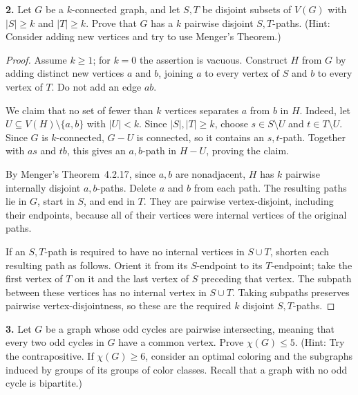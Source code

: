 \documentclass[12pt]{amsart}
\theoremstyle{conjecture}
\theoremstyle{definition}
\theoremstyle{question}
\theoremstyle{theorem}
\begin{document}
    \noindent\textbf{2.} Let $G$ be a $k$-connected graph, and let $S,T$ be disjoint subsets
    of $V(G)$ with $|S|\ge k$ and $|T|\ge k$.
    Prove that $G$ has a $k$ pairwise disjoint $S,T$-paths.
    (Hint: Consider adding new vertices and try to use Menger's Theorem.)

    \begin{proof}
        Assume $k\geq1$; for $k=0$ the assertion is vacuous.
        Construct $H$ from $G$ by adding distinct new vertices $a$ and $b$,
        joining $a$ to every vertex of $S$ and $b$ to every vertex of $T$.
        Do not add an edge $ab$.

        We claim that no set of fewer than $k$ vertices separates $a$ from $b$
        in $H$.  Indeed, let $U\subseteq V(H)\setminus\{a,b\}$ with $|U|<k$.
        Since $|S|,|T|\geq k$, choose $s\in S\setminus U$ and
        $t\in T\setminus U$.  Since $G$ is $k$-connected, $G-U$ is connected,
        so it contains an $s,t$-path.  Together with $as$ and $tb$, this gives
        an $a,b$-path in $H-U$, proving the claim.

        By Menger's Theorem~4.2.17, since $a,b$ are nonadjacent, $H$ has $k$
        pairwise internally disjoint $a,b$-paths.  Delete $a$ and $b$ from each
        path.  The resulting paths lie in $G$, start in $S$, and end in $T$.
        They are pairwise vertex-disjoint, including their endpoints, because
        all of their vertices were internal vertices of the original paths.

        If an $S,T$-path is required to have no internal vertices in
        $S\cup T$, shorten each resulting path as follows.  Orient it from its
        $S$-endpoint to its $T$-endpoint; take the first vertex of $T$ on it
        and the last vertex of $S$ preceding that vertex.  The subpath between
        these vertices has no internal vertex in $S\cup T$.  Taking subpaths
        preserves pairwise vertex-disjointness, so these are the required $k$
        disjoint $S,T$-paths.
    \end{proof}

    \noindent\textbf{3.} Let $G$ be a graph whose odd cycles are pairwise intersecting,
    meaning that every two odd cycles in $G$ have a common vertex.
    Prove $\chi(G)\le 5$.
    (Hint: Try the contrapositive.
    If $\chi(G)\ge 6$, consider an optimal coloring and the subgraphs induced by groups of
    its groups of color classes.
    Recall that a graph with no odd cycle is bipartite.)
\end{document}
